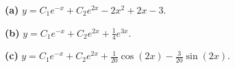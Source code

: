 \noindent\textbf{(a)} $y=C_1e^{-x}+C_2e^{2x}-2x^2+2x-3$.

\noindent\textbf{(b)} $y=C_1e^{-x}+C_2e^{2x}+\tfrac14e^{3x}$.

\noindent\textbf{(c)} $y=C_1e^{-x}+C_2e^{2x}+\tfrac1{20}\cos(2x)-\tfrac3{20}\sin(2x)$.
